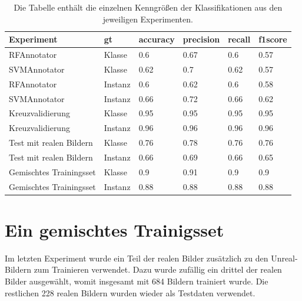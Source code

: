 \begin{table}
\centering
{}
\begin{tabularx}{\textwidth}{Xlllll}
\textbf{Experiment}	&	\textbf{\gls{gt}}	& \textbf{\gls{accuracy}} & \textbf{\gls{precision}}	& \textbf{\gls{recall}}	& \textbf{\gls{f1score}} \\ \hline
RFAnnotator				&Klasse		&0.6	&0.67	&0.6	&0.57	\\
SVMAnnotator			&Klasse		&0.62	&0.7	&0.62	&0.57	\\
RFAnnotator				&Instanz	&0.6	&0.62	&0.6	&0.58	\\
SVMAnnotator			&Instanz	&0.66	&0.72	&0.66	&0.62	\\ \hline
Kreuzvalidierung		&Klasse		&0.95	&0.95	&0.95	&0.95	\\
Kreuzvalidierung		&Instanz	&0.96	&0.96	&0.96	&0.96	\\ \hline
Test mit realen Bildern	&Klasse		&0.76	&0.78	&0.76	&0.76	\\
Test mit realen Bildern	&Instanz	&0.66	&0.69	&0.66	&0.65	\\ \hline
Gemischtes Trainingsset	&Klasse		&0.9	&0.91	&0.9	&0.9	\\
Gemischtes Trainingsset	&Instanz	&0.88	&0.88	&0.88	&0.88	\\
\end{tabularx}
\caption[Übersicht der Kenngrößen der einzelnen Experimente]{Die Tabelle enthält die einzelnen Kenngrößen der Klassifikationen aus den jeweiligen Experimenten.}
\label{tab:classification_all}
\end{table}


\section{Ein gemischtes Trainigsset}
\label{unrealrealmixed}

Im letzten Experiment wurde ein Teil der realen Bilder zusätzlich zu den Unreal-Bildern zum Trainieren verwendet. Dazu wurde zufällig ein drittel der realen Bilder ausgewählt, womit insgesamt mit 684 Bildern trainiert wurde. Die restlichen 228 realen Bildern wurden wieder als Testdaten verwendet. \par


